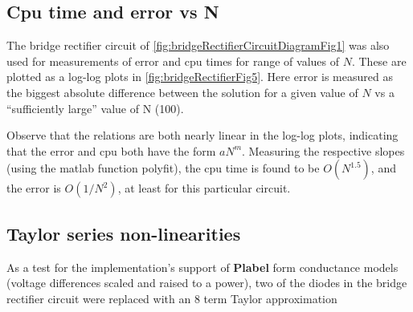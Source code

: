 \subsection{Cpu time and error vs N}

The bridge rectifier circuit of
\cref{fig:bridgeRectifierCircuitDiagramFig1} was also used for
measurements of error and cpu times for range of values of \( N \).
These are plotted as a log-log plots in
\cref{fig:bridgeRectifierFig5}.
Here error is measured as the biggest absolute difference between the solution for a given value of \( N \) vs
a ``sufficiently large'' value of N (100).


Observe that the relations are both nearly linear in the log-log plots, indicating that the error and cpu both have the form \( a N^m \).
Measuring the respective slopes (using the matlab function polyfit), the cpu time is found to be \( O(N^{1.5}) \), and the error is \( O(1/N^2) \), at least for this particular circuit.


\subsection{Taylor series non-linearities}

As a test for the implementation's support of \textbf{Plabel} form conductance models (voltage differences scaled and raised to a power),
two of the diodes in the bridge rectifier circuit were replaced with an 8 term Taylor approximation

